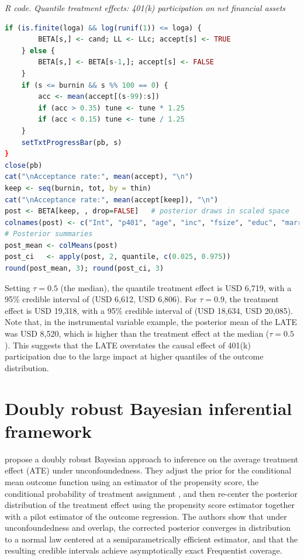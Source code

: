 \begin{tcolorbox}[enhanced,width=4.67in,center upper,
	fontupper=\large\bfseries,drop shadow southwest,sharp corners]
	\textit{R code. Quantile treatment effects: 401(k) participation on net financial assets}
	\begin{VF}
		\begin{lstlisting}[language=R]	
	if (is.finite(loga) && log(runif(1)) <= loga) {
		BETA[s,] <- cand; LL <- LLc; accept[s] <- TRUE
	} else {
		BETA[s,] <- BETA[s-1,]; accept[s] <- FALSE
	}
	if (s <= burnin && s %% 100 == 0) {    
		acc <- mean(accept[(s-99):s])
		if (acc > 0.35) tune <- tune * 1.25
		if (acc < 0.15) tune <- tune / 1.25
	}
	setTxtProgressBar(pb, s)
}
close(pb)
cat("\nAcceptance rate:", mean(accept), "\n")
keep <- seq(burnin, tot, by = thin)
cat("\nAcceptance rate:", mean(accept[keep]), "\n")
post <- BETA[keep, , drop=FALSE]   # posterior draws in scaled space
colnames(post) <- c("Int", "p401", "age", "inc", "fsize", "educ", "marr", "twoearn", "db", "pira", "hown")
# Posterior summaries
post_mean <- colMeans(post)
post_ci   <- apply(post, 2, quantile, c(0.025, 0.975))
round(post_mean, 3); round(post_ci, 3)
		\end{lstlisting}
	\end{VF}
\end{tcolorbox} 

Setting $\tau = 0.5$ (the median), the quantile treatment effect is USD 6,719, with a 95\% credible interval of (USD 6,612, USD 6,806). For $\tau = 0.9$, the treatment effect is USD 19,318, with a 95\% credible interval of (USD 18,634, USD 20,085). Note that, in the instrumental variable example, the posterior mean of the LATE was USD 8,520, which is higher than the treatment effect at the median ($\tau = 0.5$). This suggests that the LATE overstates the causal effect of 401(k) participation due to the large impact at higher quantiles of the outcome distribution.

\section{Doubly robust Bayesian inferential framework}\label{sec12_11}

\cite{breunig2025double} propose a doubly robust Bayesian approach to inference on the average treatment effect (ATE) under unconfoundedness. They adjust the prior for the conditional mean outcome function using an estimator of the propensity score, the conditional probability of treatment assignment \cite{rosenbaum1983central}, and then re-center the posterior distribution of the treatment effect using the propensity score estimator together with a pilot estimator of the outcome regression. The authors show that under unconfoundedness and overlap, the corrected posterior converges in distribution to a normal law centered at a semiparametrically efficient estimator, and that the resulting credible intervals achieve asymptotically exact Frequentist coverage.

